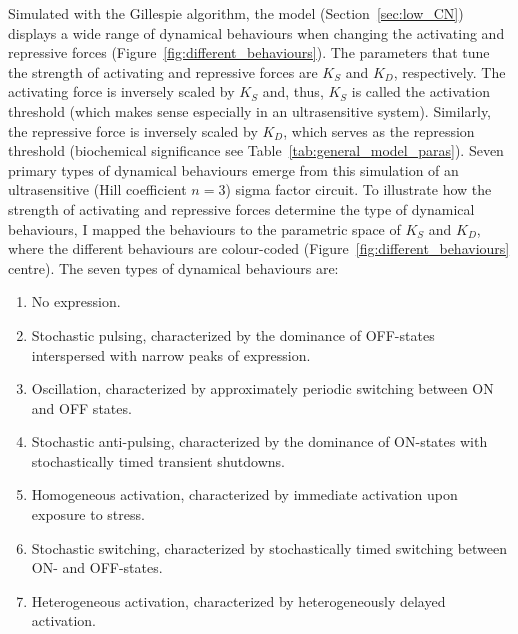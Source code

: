 Simulated with the Gillespie algorithm,
the model (Section~\ref{sec:low_CN}) 
displays a wide range of dynamical behaviours
when changing the activating and repressive forces
(Figure~\ref{fig:different_behaviours}).
The parameters that tune the strength of activating and repressive forces 
are $K_S$ and $K_D$, respectively.
The activating force is inversely scaled by $K_S$ and, thus,
$K_S$ is called the activation threshold (which makes sense
especially in an ultrasensitive system).
Similarly, the repressive force is inversely scaled by $K_D$,
which serves as the repression threshold
(biochemical significance see Table~\ref{tab:general_model_paras}).
Seven primary types of dynamical behaviours emerge from
this simulation of an ultrasensitive (Hill coefficient $n = 3$)
sigma factor circuit.
To illustrate how the strength of activating and repressive 
forces determine the type of dynamical behaviours, I mapped
the behaviours to the parametric space of $K_S$ and $K_D$,
where the different behaviours are colour-coded
(Figure~\ref{fig:different_behaviours} centre).
The seven types of dynamical behaviours are:

\begin{enumerate}[label=(\alph*)]
    \item No expression.
    \item Stochastic pulsing, characterized by the dominance of OFF-states
    interspersed with narrow peaks of expression.
    \item Oscillation, characterized by approximately periodic switching
    between ON and OFF states.
    \item Stochastic anti-pulsing, characterized by the dominance of 
    ON-states with stochastically timed transient shutdowns.
    \item Homogeneous activation, characterized by immediate activation
    upon exposure to stress.
    \item Stochastic switching, characterized by stochastically timed
    switching between ON- and OFF-states.
    \item Heterogeneous activation, characterized by heterogeneously
    delayed activation.
\end{enumerate}

